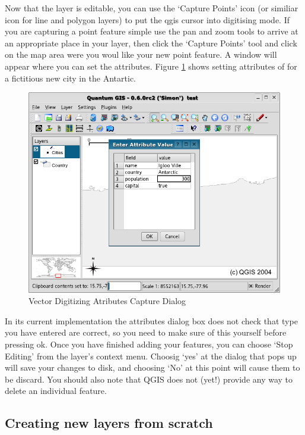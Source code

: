 Now that the layer is editable, you can use the `Capture Points' icon (or similiar icon for line and polygon layers) to put the qgis cursor into digitising mode. If you are capturing a point feature simple use the pan and zoom tools to arrive at an appropriate place in your layer, then click the `Capture Points' tool and click on the map area were you woul like your new point feature. A window will appear where you can set the attributes. Figure \ref{fig:vector_digitising} shows setting attributes of for a fictitious new city in the Antartic.

\begin{figure}[h]
   \begin{center}
   \caption{Vector Digitizing Atributes Capture Dialog}\label{fig:vector_digitising}\smallskip
   \includegraphics[scale=.5]{qgis_user_guide_images/digitising_attributes}
\end{center}  
\end{figure}

In its current implementation the attributes dialog box does not check that type you have entered are correct, so you need to make sure of this yourself before pressing ok. Once you have finished adding your features, you can choose `Stop Editing' from the layer's context menu. Choosig `yes' at the dialog that pops up will save your changes to disk, and choosing `No' at this point will cause them to be discard. You should also note that QGIS does not (yet!) provide any way to delete an individual feature.

\subsection{Creating new layers from scratch}


